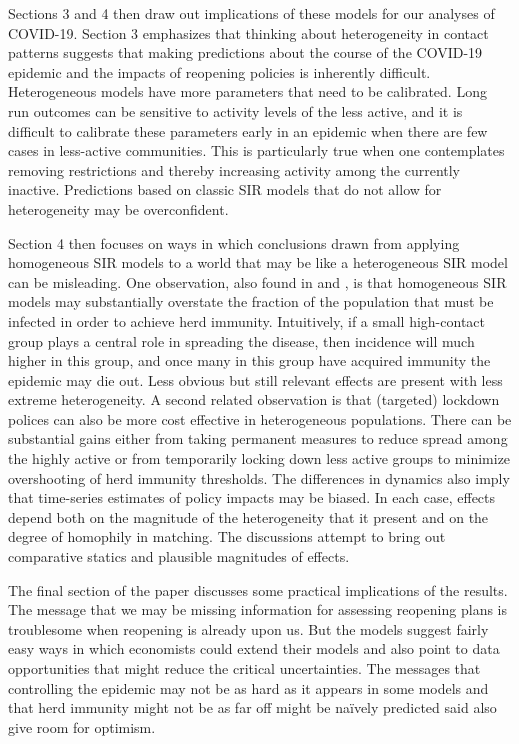 \documentclass[11pt]{article}
\begin{document}
Sections 3 and 4 then draw out implications of these models for our analyses of COVID-19. Section 3 emphasizes that  thinking about heterogeneity in contact patterns suggests that making predictions about the course of the COVID-19 epidemic and the impacts of reopening policies is 
inherently difficult. Heterogeneous models have more parameters that need to be calibrated. Long run outcomes 
can be sensitive to activity levels of the less active,
and it is difficult to calibrate these parameters early in an epidemic when there are few cases in less-active communities. This is particularly true when one contemplates removing restrictions and thereby increasing activity among the currently inactive. Predictions
based on classic SIR models that do not allow for heterogeneity may be overconfident.

Section 4 then focuses on ways in which conclusions drawn from applying homogeneous SIR models to a world that may be like a heterogeneous SIR model can be misleading. One observation, also found in \citet{gomes2020individual} and \citet{britton2020disease}, is that homogeneous SIR 
models may substantially overstate the fraction of the
population that must be infected in order to achieve herd immunity. Intuitively, if a small high-contact group plays a central role in spreading the disease, then incidence will much higher in this group, and once many in this group have acquired immunity the epidemic may die out. 
Less obvious but still relevant effects are present with less extreme heterogeneity. A second related observation is that (targeted) lockdown polices can also be more cost effective in heterogeneous populations. There can be substantial gains either from taking permanent measures to reduce spread among the highly active or from
temporarily locking down less active groups to minimize
overshooting of herd immunity thresholds. The differences in dynamics also imply that time-series estimates of policy impacts may be biased. In each case, effects depend both on the magnitude of the heterogeneity that it present and on the degree of homophily in matching. The discussions attempt to bring out comparative statics and plausible magnitudes of effects.

The final section of the paper discusses some practical implications of the results. The message that we may be missing
information for assessing reopening plans is troublesome when reopening is already upon us. But the models suggest
fairly easy ways in which economists  could extend their models and also point to data opportunities that might  
reduce the critical uncertainties. The messages that controlling the epidemic may not be as hard as it appears in some
models and that herd immunity might not be as far off might be na\"ively predicted said also give room for optimism.
\end{document}
